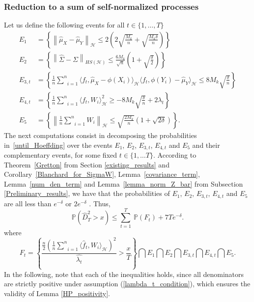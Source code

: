 \documentclass[twoside,11pt]{article}
\newcommand{\Hk}{\mathcal{H}}
\newcommand{\HSk}{HS(\mathcal{H})}
\newcommand{\nb}{n}
\newcommand{\PPO}{\mathbb{P} }
\begin{document}
\subsubsection*{Reduction to a sum of self-normalized processes}  
Let us define the following events for all $t \in \{1,\ldots,T\}$ 
\begin{align*}
    E_1 &=  \left\{ \left \|  \widehat{\mu}_X - \widehat{\mu}_Y \right \|_{\Hk} \leq  2 \left( 2\sqrt{\frac{M_k}{\nb}} + \sqrt{\frac{M_k\delta}{\nb}} \right) \right\} \\
    E_2 &= \left\{ \left \| \widehat{\Sigma} - \Sigma \right \|_{\HSk} \leq \frac{6 M_k}{\sqrt{\nb}} \left( 1 + \sqrt{\frac{\delta}{2}}\right) \right\} \\
    E_{3,t} &= \left\{ \frac{1}{\nb} \underset{i=1}{\overset{\nb}{\sum}} \langle f_t, \widehat{\mu}_X - \phi(X_i) \rangle_{\Hk} \langle f_t,\phi(Y_i) - \widehat{\mu}_Y  \rangle_{\Hk} \leq 8 M_k \sqrt{\frac \delta \nb}   \right\} \\
    E_{4,t} &=  \left\{ \frac{1}{\nb} \underset{i=1}{\overset{\nb}{\sum}} \langle f_t, W_i \rangle_{\Hk}^2 \geq - 8 M_k \sqrt{\frac{\delta}{\nb}} + 2 \lambda_t \right\} \\
    E_5 &=  \left\{ \left\| \frac{1}{\nb} \underset{i=1}{\overset{\nb}{\sum}} W_i\right\|_{\Hk} \leq \sqrt{\frac{2 M_k}{\nb}} \left(1+\sqrt{2\delta}\right) \right\}.
\end{align*}
The next computations consist in decomposing the probabilities in~\eqref{until_Hoeffding} over the events $E_1$, $E_2$, $E_{3,t}$, $E_{4,t}$ and $E_5$ and their complementary events, for some fixed $t \in \{1, \dots T\}$. According to Theorem~\ref{Gretton} from Section \ref{existing_results}  and Corollary~\ref{Blanchard_for_SigmaW}, Lemma~\ref{covariance_term}, Lemma~\ref{num_den_term} and Lemma~\ref{lemma_norm_Z_bar} from Subsection \ref{Preliminary_results}, we have that the probabilities of   $E_1$, $E_2$, $E_{3,t}$, $E_{4,t}$ and $E_5$ are all less than $ e^{-\delta}$ or $2e^{-\delta}$ . Thus,
\begin{equation}
    \PPO \left(\widehat{D}^2_T > x \right)  
    \leq  \underset{t=1}{\overset{T}{\sum}} \ \PPO (F_t ) + 7 T e^{-\delta}.
    \label{splitting}  
\end{equation}
where 
$$F_t = \left\{ \frac{ \frac{\nb}{2} \left(  \frac{1}{\nb} \underset{i=1}{\overset{\nb}{\sum}} \langle \widehat{f}_t , W_i \rangle_{\Hk} \right)^2}{\widehat{\lambda_t}}  > \frac{x}{T}  \right\}\bigcap E_1 \bigcap E_2  \bigcap E_{3,t} \bigcap E_{4,t} \bigcap E_5.$$
In the following, note that each of the inequalities holds, since all denominators are strictly positive under assumption (\ref{lambda_t_condition}), which ensures the validity of Lemma \ref{HP_positivity}. 
\end{document}
